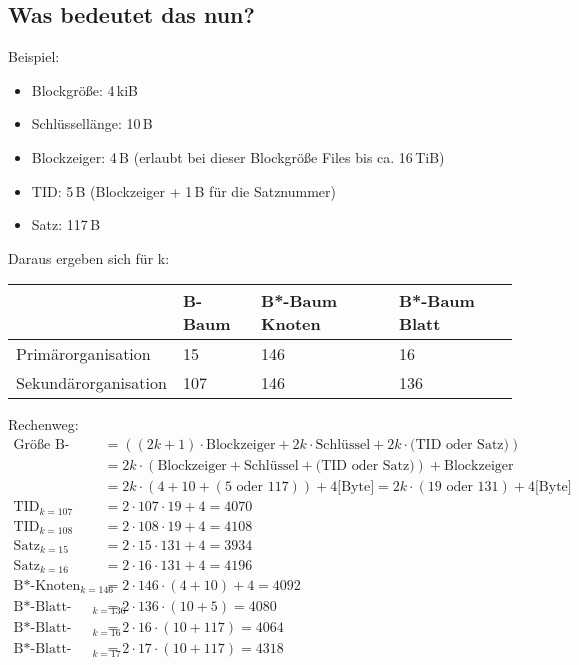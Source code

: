 \begin{solution}
\subsection*{Was bedeutet das nun?}
Beispiel:
\begin{itemize}
	\item Blockgröße: 4\,kiB
	\item Schlüssellänge: 10\,B
	\item Blockzeiger: 4\,B (erlaubt bei dieser Blockgröße Files bis ca. 16\,TiB)
	\item TID: 5\,B (Blockzeiger + 1\,B für die Satznummer)
	\item Satz: 117\,B
\end{itemize}
Daraus ergeben sich für k:

\begin{tabular}{p{4cm} p{2cm} p{3.5cm} p{3.5cm}}
										& B-Baum 	& B*-Baum Knoten	& B*-Baum Blatt	\\
	\hline
	Primärorganisation 		& 15 			& 146 						& 16 					\\
	\hline
	Sekundärorganisation 	& 107 			& 146 						& 136					\\
	\hline
\end{tabular}

Rechenweg:
\begin{align*}
\text{Größe B-Baum Knoten} &= 
((2k + 1) \cdot \text{Blockzeiger} + 2k \cdot \text{Schlüssel} + 2k \cdot \text{(TID oder Satz)})\\
&= 2k \cdot (\text{Blockzeiger} + \text{Schlüssel} + \text{(TID oder Satz)}) + \text{Blockzeiger}\\
&= 2k \cdot (4 + 10 + (5\text{ oder }117)) + 4 \text{[Byte]} = 2k \cdot (19\text{ oder }131) + 4 \text{[Byte]}\\
\text{TID}_{k = 107} &=2 \cdot 107 \cdot 19 + 4 = 4070\\
\text{TID}_{k = 108} &=2 \cdot 108 \cdot 19 + 4 = 4108\\
\text{Satz}_{k = 15} &= 2 \cdot 15 \cdot 131 + 4 = 3934\\
\text{Satz}_{k = 16} &= 2 \cdot 16 \cdot 131 + 4 = 4196\\
\text{B*-Knoten}_{k=146} &= 2\cdot 146 \cdot (4 + 10) + 4 = 4092\\
\text{B*-Blatt-TID}_{k=136} &= 2\cdot 136\cdot (10+5) = 4080\\
\text{B*-Blatt-Satz}_{k=16} &= 2\cdot 16\cdot (10+117) = 4064\\
\text{B*-Blatt-Satz}_{k=17} &= 2\cdot 17\cdot (10+117) = 4318\\
\end{align*}


\end{solution}
